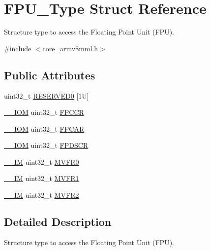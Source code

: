 \hypertarget{struct_f_p_u___type}{}\section{F\+P\+U\+\_\+\+Type Struct Reference}
\label{struct_f_p_u___type}


Structure type to access the Floating Point Unit (F\+PU).  




{\ttfamily \#include $<$core\+\_\+armv8mml.\+h$>$}

\subsection*{Public Attributes}
\begin{DoxyCompactItemize}
\item 
uint32\+\_\+t \hyperlink{struct_f_p_u___type_aeab77b3f17bf5a628cb743807d8fde7e}{R\+E\+S\+E\+R\+V\+E\+D0} \mbox{[}1\+U\mbox{]}
\item 
\hyperlink{core__sc300_8h_ab6caba5853a60a17e8e04499b52bf691}{\+\_\+\+\_\+\+I\+OM} uint32\+\_\+t \hyperlink{struct_f_p_u___type_af1b708c5e413739150df3d16ca3b7061}{F\+P\+C\+CR}
\item 
\hyperlink{core__sc300_8h_ab6caba5853a60a17e8e04499b52bf691}{\+\_\+\+\_\+\+I\+OM} uint32\+\_\+t \hyperlink{struct_f_p_u___type_a55263b468d0f8e11ac77aec9ff87c820}{F\+P\+C\+AR}
\item 
\hyperlink{core__sc300_8h_ab6caba5853a60a17e8e04499b52bf691}{\+\_\+\+\_\+\+I\+OM} uint32\+\_\+t \hyperlink{struct_f_p_u___type_a58d1989664a06db6ec2e122eefa9f04a}{F\+P\+D\+S\+CR}
\item 
\hyperlink{core__sc300_8h_a4cc1649793116d7c2d8afce7a4ffce43}{\+\_\+\+\_\+\+IM} uint32\+\_\+t \hyperlink{struct_f_p_u___type_a4f19014defe6033d070b80af19ef627c}{M\+V\+F\+R0}
\item 
\hyperlink{core__sc300_8h_a4cc1649793116d7c2d8afce7a4ffce43}{\+\_\+\+\_\+\+IM} uint32\+\_\+t \hyperlink{struct_f_p_u___type_a66f8cfa49a423b480001a4e101bf842d}{M\+V\+F\+R1}
\item 
\hyperlink{core__sc300_8h_a4cc1649793116d7c2d8afce7a4ffce43}{\+\_\+\+\_\+\+IM} uint32\+\_\+t \hyperlink{struct_f_p_u___type_a479130e53a8b3c36fd8ee38b503a3911}{M\+V\+F\+R2}
\end{DoxyCompactItemize}


\subsection{Detailed Description}
Structure type to access the Floating Point Unit (F\+PU). 

